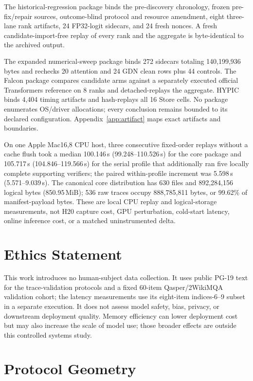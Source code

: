 \documentclass{article}
\begin{document}
The historical-regression package binds the pre-discovery chronology, frozen
pre-fix/repair sources, outcome-blind protocol and resource amendment, eight
three-lane rank artifacts, 24 FP32-logit sidecars, and 24 fresh nonces.  A fresh
candidate-import-free replay of every rank and the aggregate is byte-identical
to the archived output.

The expanded numerical-sweep package binds 272 sidecars totaling 140,199,936
bytes and rechecks 20 attention and 24 GDN clean rows plus 44 controls.  The
Falcon package compares candidate arms against a separately executed official
Transformers reference on 8 ranks and detached-replays the aggregate.  HYPIC
binds 4,404 timing artifacts and hash-replays all 16 Store cells.  No package
enumerates OS/driver allocations; every conclusion remains bounded to its
declared configuration.  Appendix~\ref{app:artifact} maps exact artifacts and
boundaries.

On one Apple Mac16,8 CPU host, three consecutive fixed-order replays without a
cache flush took a median 100.146\,s (99.248--110.526\,s) for the core package
and 105.717\,s (104.846--119.566\,s) for the serial profile that additionally
ran five locally complete supporting verifiers; the paired within-profile
increment was 5.598\,s (5.571--9.039\,s).  The canonical core distribution has
630 files and 892,284,156 logical bytes (850.95\,MiB); 536 raw traces occupy
888,785,811 bytes, or 99.62\% of manifest-payload bytes.  These are local CPU
replay and logical-storage measurements, not H20 capture cost, GPU perturbation,
cold-start latency, online inference cost, or a matched uninstrumented delta.

\section{Ethics Statement}

This work introduces no human-subject data collection.  It uses public PG-19
text for the trace-validation protocols and a fixed 60-item
Qasper/2WikiMQA validation cohort; the latency measurements use its eight-item
indices-6--9 subset in a separate execution.
It does not assess model safety, bias, privacy, or downstream deployment
quality.  Memory efficiency can lower deployment cost but may also increase
the scale of model use; those broader effects are outside this controlled
systems study.

\section{Protocol Geometry}
\label{app:protocol-geometry}
\end{document}

